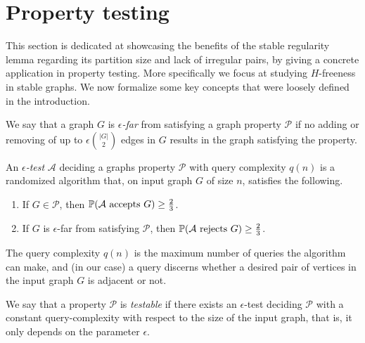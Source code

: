 \section{Property testing} \label{sec:section_6}

    This section is dedicated at showcasing the benefits of the stable regularity lemma regarding its partition size
    and lack of irregular pairs, by giving a concrete application in property testing.
    More specifically we focus at studying $H$-freeness in stable graphs.
    We now formalize some key concepts that were loosely defined in the introduction.

    \begin{definition}
        We say that a graph $G$ is \emph{$\epsilon$-far} from satisfying a graph property $\mathcal{P}$ if no adding or
        removing of up to $\epsilon {|G| \choose 2}$ edges in $G$ results in the graph satisfying the property.
    \end{definition}

    \begin{definition} \label{def:epsilon_test}
        An \emph{$\epsilon$-test} $\mathcal{A}$ deciding a graphs property $\mathcal{P}$ with query complexity
        $q(n)$ is a randomized algorithm that, on input graph $G$ of size $n$,
        satisfies the following.
        \begin{enumerate}[label={\Roman*}., ref={\Roman*}, font=\rmfamily]
            \item If $G \in \mathcal{P}$, then $\mathbb{P}( \mathcal{A} \text{ accepts } G ) \geq \frac{2}{3}$.
            \item If $G$ is $\epsilon$-far from satisfying $\mathcal{P}$,
                then $\mathbb{P}( \mathcal{A} \text{ rejects } G ) \geq \frac{2}{3}$.
        \end{enumerate}
        The query complexity $q(n)$ is the maximum number of queries the algorithm can make, and (in our case)
        a query discerns whether a desired pair of vertices in the input graph $G$ is adjacent or not.
    \end{definition}

    \begin{definition}
        We say that a property $\mathcal{P}$ is \emph{testable} if there exists an $\epsilon$-test deciding $\mathcal{P}$
        with a constant query-complexity with respect to the size of the input graph, that is, it only depends on the
        parameter $\epsilon$.
    \end{definition}

